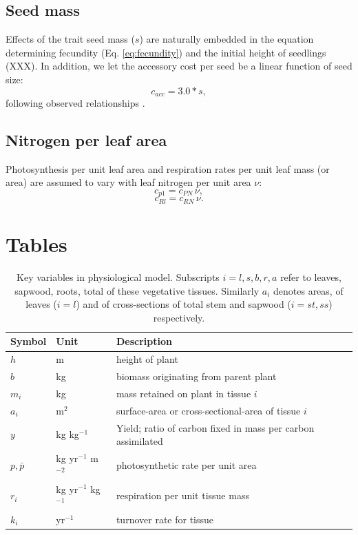 \documentclass[10pt,twoside]{article}
\begin{document}
\subsection{Seed mass}

Effects of the trait seed mass ($s$) are naturally embedded in the equation determining 
fecundity (Eq. \ref{eq:fecundity}) and the initial height of seedlings (XXX). In addition,
we let the accessory cost per seed be a linear function of seed size:
$$c_{acc} = 3.0 * s,$$
following observed relationships \citep{Henery-2001}.

\subsection{Nitrogen per leaf area}

Photosynthesis per unit leaf area and respiration rates per unit leaf mass (or area) 
are assumed to vary with leaf nitrogen per unit area $\nu$:
$$c_{p1}=c_{PN} \, \nu,$$
$$c_{Rl}=c_{RN}  \, \nu.$$

\clearpage

\section{Tables}\label{tables}

\begin{table}[h!]
 \caption{Key variables in physiological model. 
 Subscripts $i=l,s,b,r,a$ refer to leaves, sapwood, roots, total of these vegetative tissues. Similarly $a_i$ denotes areas, of leaves ($i=l$) and of cross-sections of total stem and sapwood ($i= st,ss$) respectively.}
\centering
  \begin{tabular}{p{2cm}p{2cm}p{8cm}}
  \hline
  Symbol & Unit & Description \\
  \hline
  $h$   & m  & height of plant\\
  $b$   & kg  & biomass originating from parent plant\\
  $m_i$ & kg  & mass retained on plant in tissue $i$\\
  $a_i$ & m$^2$  & surface-area or cross-sectional-area of tissue $i$\\
  $y$ & kg kg$^{-1}$ & Yield; ratio of carbon fixed in mass per carbon assimilated \\
  $p,\bar{p}$ & kg yr$^{-1}$ m$^{-2}$  & photosynthetic rate per unit area \\
  $r_i$ & kg yr$^{-1}$ kg$^{-1}$  & respiration per unit tissue mass \\
  $k_i$ & yr$^{-1}$ & turnover rate for tissue \\
  \hline
  \end{tabular}
\label{tab:definitions}
\end{table}
\end{document}
